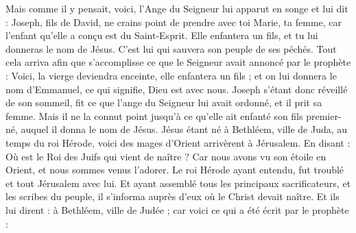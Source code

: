 \begin{multicols}{2}
Mais comme il y pensait, voici, l'Ange du Seigneur{} lui apparut en songe et lui dit : Joseph, fils de David, ne crains point de prendre avec toi Marie, ta femme, car l’enfant qu’elle a conçu est du Saint-Esprit.
Elle enfantera un fils, et tu lui donneras le nom de Jésus. C’est lui qui sauvera son peuple de ses péchés.
Tout cela arriva afin que s’accomplisse ce que le Seigneur avait annoncé par le prophète :
Voici, la vierge deviendra enceinte, elle enfantera un fils ; et on lui donnera le nom d’Emmanuel{}, ce qui signifie, Dieu est avec nous.
Joseph s’étant donc réveillé de son sommeil, fit ce que l'ange du Seigneur lui avait ordonné, et il prit sa femme.
Mais il ne la connut point jusqu'à ce qu'elle ait enfanté son fils premier-né, auquel il donna le nom de Jésus.
\VerseOne{}Jésus étant né à Bethléem, ville de Juda, au temps du roi Hérode, voici des mages d'Orient arrivèrent à Jérusalem.
En disant : Où est le Roi des Juifs qui vient de naître ? Car nous avons vu son étoile en Orient, et nous sommes venus l'adorer.
Le roi Hérode ayant entendu, fut troublé et tout Jérusalem avec lui.
Et ayant assemblé tous les principaux sacrificateurs, et les scribes du peuple, il s'informa auprès d'eux où le Christ devait naître.
Et ils lui dirent : à Bethléem, ville de Judée ; car voici ce qui a été écrit par le prophète :

\end{multicols}
